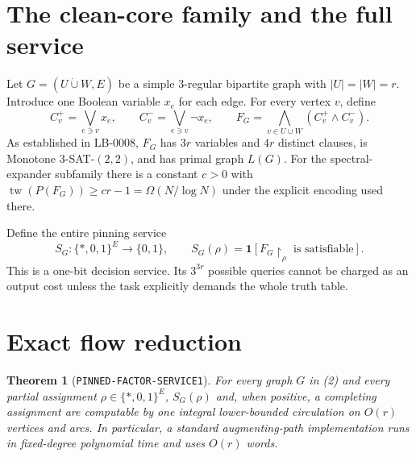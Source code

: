 \documentclass[11pt]{article}
\newtheorem{theorem}{Theorem}
\begin{document}
\section{The clean-core family and the full service}

Let \(G=(U\mathbin{\dot\cup}W,E)\) be a simple \(3\)-regular bipartite graph
with \(|U|=|W|=r\). Introduce one Boolean variable \(x_e\) for each edge.
For every vertex \(v\), define
\[
 C_v^+=\bigvee_{e\ni v}x_e,\qquad
 C_v^-=\bigvee_{e\ni v}\neg x_e,\qquad
 F_G=\bigwedge_{v\in U\cup W}(C_v^+\wedge C_v^-).
\tag{2}
\]
As established in LB-0008, \(F_G\) has \(3r\) variables and \(4r\) distinct
clauses, is Monotone \(3\)-SAT-\((2,2)\), and has primal graph \(L(G)\).
For the spectral-expander subfamily there is a constant \(c>0\) with
\(\operatorname{tw}(P(F_G))\ge cr-1=\Omega(N/\log N)\) under the explicit
encoding used there.

Define the entire pinning service
\[
 S_G:\{*,0,1\}^{E}\longrightarrow\{0,1\},\qquad
 S_G(\rho)=\mathbf 1[F_G\!\upharpoonright_{\rho}
                    \text{ is satisfiable}].
\tag{3}
\]
This is a one-bit decision service. Its \(3^{3r}\) possible queries cannot be
charged as an output cost unless the task explicitly demands the whole truth
table.

\section{Exact flow reduction}

\begin{theorem}[\texttt{PINNED-FACTOR-SERVICE1}]
For every graph \(G\) in (2) and every partial assignment
\(\rho\in\{*,0,1\}^{E}\), \(S_G(\rho)\) and, when positive, a completing
assignment are computable by one integral lower-bounded circulation on
\(O(r)\) vertices and arcs. In particular, a standard augmenting-path
implementation runs in fixed-degree polynomial time and uses \(O(r)\) words.
\end{theorem}
\end{document}
